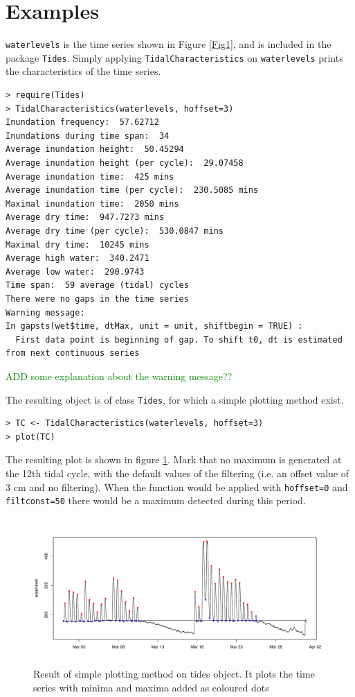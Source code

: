 \documentclass[10pt,a4wide]{article}
\begin{document}
\section{Examples}
\texttt{waterlevels} is the time series shown in Figure \ref{Fig1}, and is included in the package \texttt{Tides}. Simply applying \texttt{TidalCharacteristics} on \texttt{waterlevels} prints the characteristics of the time series.
\begin{verbatim}
> require(Tides)
> TidalCharacteristics(waterlevels, hoffset=3)
Inundation frequency:  57.62712 
Inundations during time span:  34 
Average inundation height:  50.45294 
Average inundation height (per cycle):  29.07458 
Average inundation time:  425 mins 
Average inundation time (per cycle):  230.5085 mins 
Maximal inundation time:  2050 mins 
Average dry time:  947.7273 mins 
Average dry time (per cycle):  530.0847 mins 
Maximal dry time:  10245 mins 
Average high water:  340.2471 
Average low water:  290.9743 
Time span:  59 average (tidal) cycles 
There were no gaps in the time series
Warning message:
In gapsts(wet$time, dtMax, unit = unit, shiftbegin = TRUE) :
  First data point is beginning of gap. To shift t0, dt is estimated from next continuous series
\end{verbatim}
\textcolor{green}{ADD some explanation about the warning message??}


The resulting object is of class \texttt{Tides}, for which a simple plotting method exist. 

\begin{verbatim}
> TC <- TidalCharacteristics(waterlevels, hoffset=3)
> plot(TC)
\end{verbatim}
The resulting plot is shown in figure \ref{Fig3}. Mark that no maximum is generated at the 12th tidal cycle, with the default values of the filtering (i.e. an offset value of 3 cm and no filtering). When the function would be applied with \texttt{hoffset=0} and \texttt{filtconst=50} there would be a maximum detected during this period.
\begin{figure}[h]
\begin{center}
\includegraphics{Tides-TideFig3}
\end{center}
\caption{Result of simple plotting method on tides object. It plots the time series with minima and maxima added as coloured dots} 
\label{Fig3}
\end{figure}






\end{document}
